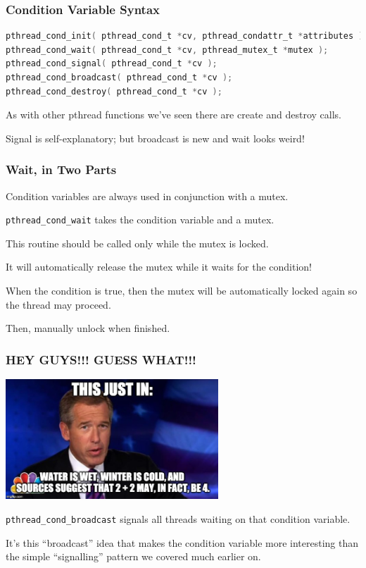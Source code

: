 \begin{frame}[fragile]
	\frametitle{Condition Variable Syntax}

	\begin{lstlisting}[language=C]
pthread_cond_init( pthread_cond_t *cv, pthread_condattr_t *attributes );
pthread_cond_wait( pthread_cond_t *cv, pthread_mutex_t *mutex );
pthread_cond_signal( pthread_cond_t *cv );
pthread_cond_broadcast( pthread_cond_t *cv );
pthread_cond_destroy( pthread_cond_t *cv );
\end{lstlisting}

	As with other pthread functions we've seen there are create and destroy calls.

	Signal is self-explanatory; but broadcast is new and wait looks weird!

\end{frame}


\begin{frame}
	\frametitle{Wait, in Two Parts}

	Condition variables are always used in conjunction with a mutex.

	\texttt{pthread\_cond\_wait} takes the condition variable and a mutex.

	This routine should be called only while the mutex is locked.

	It will automatically release the mutex while it waits for the condition!

	When the condition is true, then the mutex will be automatically locked again so the thread may proceed.

	Then, manually unlock when finished.

\end{frame}

\begin{frame}
	\frametitle{HEY GUYS!!! GUESS WHAT!!!}
	\begin{center}
		\includegraphics[width=0.6\textwidth]{images/newsanchor.jpg}
	\end{center}

	\texttt{pthread\_cond\_broadcast} signals all threads waiting on that condition variable.

	It's this ``broadcast'' idea that makes the condition variable more interesting than the simple ``signalling'' pattern we covered much earlier on.

\end{frame}

